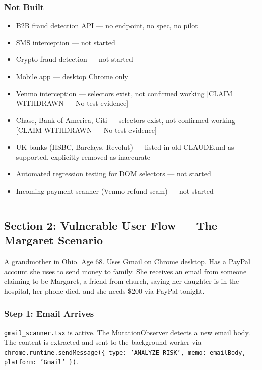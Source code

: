 \documentclass[11pt, letterpaper]{article}
\newcommand{\withdrawn}[1]{\textcolor{withdrawn}{[CLAIM WITHDRAWN --- #1]}}
\begin{document}
  \subsubsection{Not Built}

  \begin{itemize}[nosep]
    \item B2B fraud detection API --- no endpoint, no spec, no pilot
    \item SMS interception --- not started
    \item Crypto fraud detection --- not started
    \item Mobile app --- desktop Chrome only
    \item Venmo interception --- selectors exist, not confirmed working \withdrawn{No test evidence}
    \item Chase, Bank of America, Citi --- selectors exist, not confirmed working \withdrawn{No test evidence}
    \item UK banks (HSBC, Barclays, Revolut) --- listed in old CLAUDE.md as supported, explicitly removed as inaccurate
    \item Automated regression testing for DOM selectors --- not started
    \item Incoming payment scanner (Venmo refund scam) --- not started
  \end{itemize}

  \vspace{12pt}
  \hrule
  \vspace{12pt}

  \subsection{Section 2: Vulnerable User Flow --- The Margaret Scenario}

  A grandmother in Ohio. Age 68. Uses Gmail on Chrome desktop. Has a PayPal account she uses to send money to family. She receives an email from someone claiming to be Margaret, a friend from church, saying her daughter is in the hospital, her phone died, and she needs \$200 via PayPal tonight.

  \subsubsection{Step 1: Email Arrives}

  \texttt{gmail\_scanner.tsx} is active. The MutationObserver detects a new email body. The content is extracted and sent to the background worker via \texttt{chrome.runtime.sendMessage(\{ type: 'ANALYZE\_RISK', memo: emailBody, platform: 'Gmail' \})}.
\end{document}
